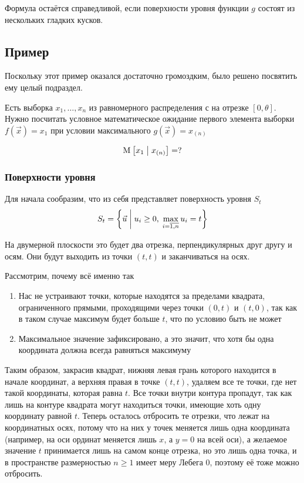 \begin{remark}
    Формула остаётся справедливой,
    если поверхности уровня функции $g$ состоят из нескольких гладких кусков.
\end{remark}

\subsection{Пример}
Поскольку этот пример оказался достаточно громоздким,
было решено посвятить ему целый подраздел.

Есть выборка $x_1, \dots, x_n$ из равномерного распределения
с на отрезке $\left[ 0, \theta \right]$.
Нужно посчитать условное математическое ожидание
первого элемента выборки $f\left( \vec{x} \right) = x_1$
при условии максимального $g\left( \vec{x} \right) = x_{\left( n \right)}$

$$\mathrm{M}_{} \left[ x_1 \;\middle|\; x_{\left( n \right)} \right] = ?$$

\subsubsection{Поверхности уровня}
Для начала сообразим, что из себя представляет поверхность уровня
$S_t$
$$S_t = \left\{ \vec{u} \;\middle|\;
    u_i \ge 0,\; \max_{i=\overline{1,n}} u_i = t \right\}$$

На двумерной плоскости это будет два отрезка,
перпендикулярных друг другу и осям.
Они будут выходить из точки $\left( t, t \right)$
и заканчиваться на осях.

Рассмотрим, почему всё именно так
\begin{enumerate}
    \item Нас не устраивают точки, которые находятся за пределами
        квадрата, ограниченного прямыми, проходящими через точки
        $\left( 0, t \right)$ и $\left( t, 0 \right)$,
        так как в таком случае максимум будет больше $t$,
        что по условию быть не может
    \item Максимальное значение зафиксировано, а это значит,
        что хотя бы одна координата должна
        всегда равняться максимуму
\end{enumerate}

Таким образом, закрасив квадрат, нижняя левая грань которого
находится в начале координат, а верхняя правая в точке $\left( t, t \right)$,
удаляем все те точки, где нет такой координаты, которая равна $t$.
Все точки внутри контура пропадут, так как лишь на контуре квадрата
могут находиться точки, имеющие хоть одну координату равной $t$.
Теперь осталось отбросить те отрезки, что лежат на координатных осях,
потому что на них у точек меняется лишь одна координата
(например, на оси ординат меняется лишь $x$, а $y=0$ на всей оси),
а желаемое значение $t$ принимается лишь на самом конце отрезка,
но это лишь одна точка, и в пространстве размерностью $n \ge 1$
имеет меру Лебега $0$, поэтому её тоже можно отбросить.

